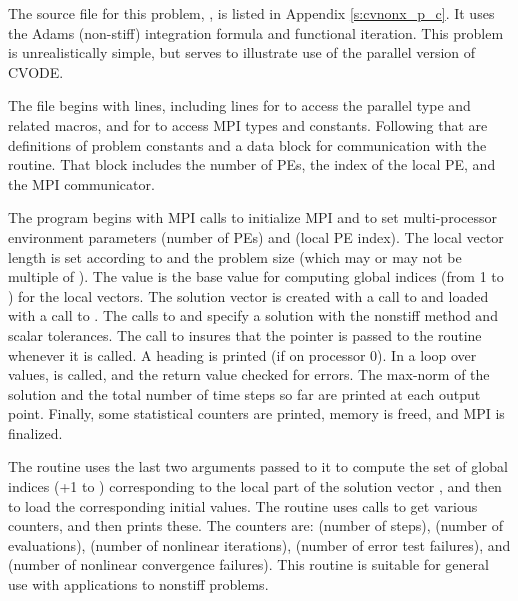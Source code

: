 The source file for this problem, , is listed in Appendix
\ref{s:cvnonx_p_c}.  It uses the Adams (non-stiff) integration formula and
functional iteration.  This problem is unrealistically simple, but
serves to illustrate use of the parallel version of CVODE.

The  file begins with  lines, including lines for
 to access the parallel  type and related
macros, and for  to access MPI types and constants. Following
that are definitions of problem constants and a data block for communication
with the  routine.  That block includes the number of PEs, the index
of the local PE, and the MPI communicator.

The  program begins with MPI calls to initialize MPI and to set
multi-processor environment parameters  (number of PEs) and
 (local PE index).  The local vector length is set according
to  and the problem size  (which may or may not be
multiple of ).  The value  is the base value for
computing global indices (from 1 to ) for the local vectors.
The solution vector  is created with a call to 
and loaded with a call to .  The calls to 
and  specify a {\cvode} solution with the nonstiff method
and scalar tolerances.  The call to  insures that the
pointer  is passed to the  routine whenever it is called.
A heading is printed (if on processor 0).  In a loop over  values,
 is called, and the return value checked for errors.  The
max-norm of the solution and the total number of time steps so far
are printed at each output point.  Finally, some statistical counters are
printed, memory is freed, and MPI is finalized.

The  routine uses the last two arguments passed to it to compute
the set of global indices (+1 to )
corresponding to the local part of the solution vector , and then to
load the corresponding initial values.  The  routine
uses  calls to get various counters, and then prints these.
The counters are:  (number of steps),  (number of
 evaluations),  (number of nonlinear iterations),
 (number of error test failures), and  (number of
nonlinear convergence failures).  This routine is suitable for general use
with {\cvode} applications to nonstiff problems.

